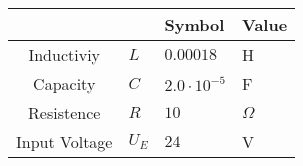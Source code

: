 \begin{tabular}{clll}
\hline
               &       & Symbol              & Value    \\
\hline
  Inductiviy   & $L$   & $0.00018$           & H        \\
   Capacity    & $C$   & $2.0 \cdot 10^{-5}$ & F        \\
  Resistence   & $R$   & $10$                & $\Omega$ \\
 Input Voltage & $U_E$ & $24$                & V        \\
\hline
\end{tabular}